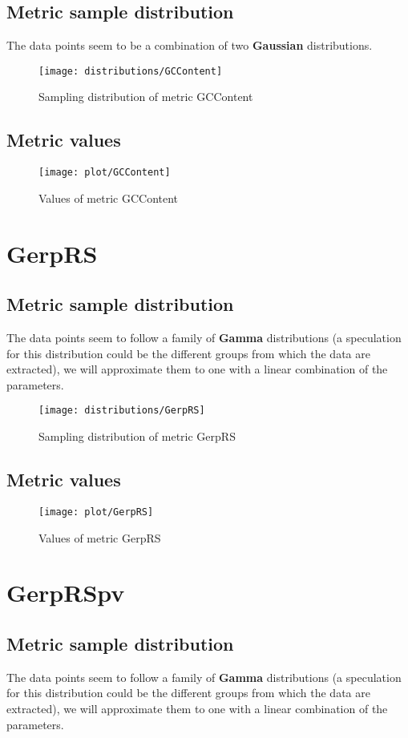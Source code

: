 \documentclass[\main/main.tex]{subfiles}
\begin{document}
\subsection{Metric sample distribution}
The data points seem to be a combination of two \textbf{Gaussian} distributions.

\begin{figure}
  \texttt{[image: distributions/GCContent]}
  \caption{Sampling distribution of metric GCContent}
\end{figure}
\subsection{Metric values}
\begin{figure}
  \texttt{[image: plot/GCContent]}
  \caption{Values of metric GCContent}
\end{figure}

\clearpage
\section{GerpRS}
\subsection{Metric sample distribution}
The data points seem to follow a family of \textbf{Gamma} distributions (a speculation for this distribution could be the different groups from which the data are extracted), we will approximate them to one with a linear combination of the parameters.

\begin{figure}
  \texttt{[image: distributions/GerpRS]}
  \caption{Sampling distribution of metric GerpRS}
\end{figure}
\subsection{Metric values}
\begin{figure}
  \texttt{[image: plot/GerpRS]}
  \caption{Values of metric GerpRS}
\end{figure}

\clearpage
\section{GerpRSpv}
\subsection{Metric sample distribution}
The data points seem to follow a family of \textbf{Gamma} distributions (a speculation for this distribution could be the different groups from which the data are extracted), we will approximate them to one with a linear combination of the parameters.
\end{document}
